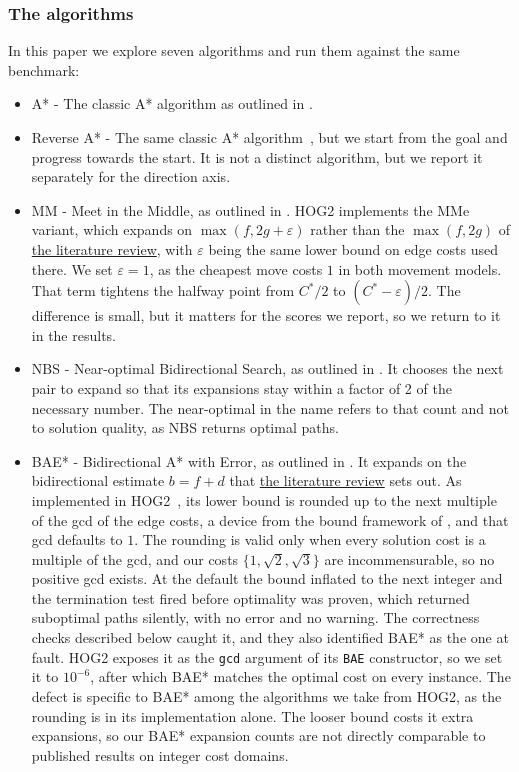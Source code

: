 \documentclass[letterpaper]{article} %
\begin{document}
\subsubsection{The algorithms}
In this paper we explore seven algorithms and run them against the same benchmark:
\begin{itemize}
  \item A* - The classic A* algorithm as outlined in \citealt{hart1968astar}.
  \item Reverse A* - The same classic A* algorithm~\cite{hart1968astar}, but we start from the goal and progress towards the start. It is not a distinct algorithm, but we report it separately for the direction axis.
  \item MM - Meet in the Middle, as outlined in \citealt{holte2017mm}. HOG2 implements the MMe variant, which expands on $\max(f, 2g+\varepsilon)$ rather than the $\max(f, 2g)$ of \hyperref[sec:litrev]{the literature review}, with $\varepsilon$ being the same lower bound on edge costs used there. We set $\varepsilon = 1$, as the cheapest move costs $1$ in both movement models. That term tightens the halfway point from $C^*/2$ to $(C^*-\varepsilon)/2$. The difference is small, but it matters for the scores we report, so we return to it in the results.
  \item NBS - Near-optimal Bidirectional Search, as outlined in \citealt{chen2017nbs}. It chooses the next pair to expand so that its expansions stay within a factor of 2 of the necessary number. The near-optimal in the name refers to that count and not to solution quality, as NBS returns optimal paths.
  \item BAE* - Bidirectional A* with Error, as outlined in \citealt{sadhukhan2013bae}. It expands on the bidirectional estimate $b = f + d$ that \hyperref[sec:litrev]{the literature review} sets out. As implemented in HOG2~\cite{sturtevant2016hog2}, its lower bound is rounded up to the next multiple of the gcd of the edge costs, a device from the bound framework of \citet{alcazar2020unifying}, and that gcd defaults to $1$. The rounding is valid only when every solution cost is a multiple of the gcd, and our costs $\{1, \sqrt{2}, \sqrt{3}\}$ are incommensurable, so no positive gcd exists. At the default the bound inflated to the next integer and the termination test fired before optimality was proven, which returned suboptimal paths silently, with no error and no warning. The correctness checks described below caught it, and they also identified BAE* as the one at fault. HOG2 exposes it as the \texttt{gcd} argument of its \texttt{BAE} constructor, so we set it to $10^{-6}$, after which BAE* matches the optimal cost on every instance. The defect is specific to BAE* among the algorithms we take from HOG2, as the rounding is in its implementation alone. The looser bound costs it extra expansions, so our BAE* expansion counts are not directly comparable to published results on integer cost domains.

\end{itemize}
\end{document}

